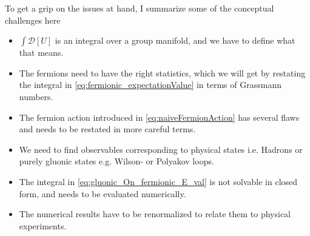 \documentclass[a4paper,10pt]{book}
\begin{document}
 To get a grip on the issues at hand, I summarize some of the conceptual challenges here

\begin{itemize}
\item $\int \mathcal{D}[U]$ is an integral over a group manifold, and we have to define what that means.
\item The fermions need to have the right statistics, which we will get by restating the integral in \eqref{eq:fermionic_expectationValue} in terms of Grassmann numbers.
\item The fermion action introduced in \eqref{eq:naiveFermionAction} has several flaws and needs to be restated in more careful terms.
\item We need to find observables corresponding to physical states i.e. Hadrons or purely gluonic states e.g. Wilson- or Polyakov loops.
\item The integral in \eqref{eq:gluonic_On_fermionic_E_val} is not solvable in closed form, and needs to be evaluated numerically.
\item The numerical results have to be renormalized to relate them to physical experiments.
\end{itemize}
\end{document}
